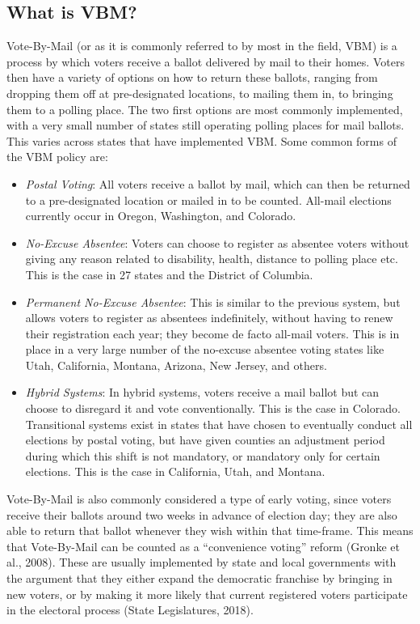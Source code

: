 \documentclass[12pt,twoside]{reedthesis}
\begin{document}
  \subsection{What is VBM?}\label{what-is-vbm}
  
  Vote-By-Mail (or as it is commonly referred to by most in the field,
  VBM) is a process by which voters receive a ballot delivered by mail to
  their homes. Voters then have a variety of options on how to return
  these ballots, ranging from dropping them off at pre-designated
  locations, to mailing them in, to bringing them to a polling place. The
  two first options are most commonly implemented, with a very small
  number of states still operating polling places for mail ballots. This
  varies across states that have implemented VBM. Some common forms of the
  VBM policy are:
  
  \begin{itemize}
  \item
    \emph{Postal Voting}: All voters receive a ballot by mail, which can
    then be returned to a pre-designated location or mailed in to be
    counted. All-mail elections currently occur in Oregon, Washington, and
    Colorado.
  \item
    \emph{No-Excuse Absentee}: Voters can choose to register as absentee
    voters without giving any reason related to disability, health,
    distance to polling place etc. This is the case in 27 states and the
    District of Columbia.
  \item
    \emph{Permanent No-Excuse Absentee}: This is similar to the previous
    system, but allows voters to register as absentees indefinitely,
    without having to renew their registration each year; they become de
    facto all-mail voters. This is in place in a very large number of the
    no-excuse absentee voting states like Utah, California, Montana,
    Arizona, New Jersey, and others.
  \item
    \emph{Hybrid Systems}: In hybrid systems, voters receive a mail ballot
    but can choose to disregard it and vote conventionally. This is the
    case in Colorado. Transitional systems exist in states that have
    chosen to eventually conduct all elections by postal voting, but have
    given counties an adjustment period during which this shift is not
    mandatory, or mandatory only for certain elections. This is the case
    in California, Utah, and Montana.
  \end{itemize}
  
  Vote-By-Mail is also commonly considered a type of early voting, since
  voters receive their ballots around two weeks in advance of election
  day; they are also able to return that ballot whenever they wish within
  that time-frame. This means that Vote-By-Mail can be counted as a
  ``convenience voting'' reform (Gronke et al., 2008). These are usually
  implemented by state and local governments with the argument that they
  either expand the democratic franchise by bringing in new voters, or by
  making it more likely that current registered voters participate in the
  electoral process (State Legislatures, 2018).
  
\end{document}
